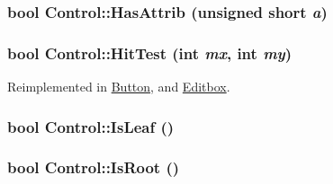 \hypertarget{class_control_969c60da0ff3cfd832a26a1310e0930d}{
\subsubsection[{HasAttrib}]{\setlength{\rightskip}{0pt plus 5cm}bool Control::HasAttrib (unsigned short {\em a})}}
\label{class_control_969c60da0ff3cfd832a26a1310e0930d}


\hypertarget{class_control_6b586494213774ccc17b161f8ed14888}{
\subsubsection[{HitTest}]{\setlength{\rightskip}{0pt plus 5cm}bool Control::HitTest (int {\em mx}, \/  int {\em my})}}
\label{class_control_6b586494213774ccc17b161f8ed14888}




Reimplemented in \hyperlink{class_button_8de2fc8228ff5599b4aaf1ae3db0725f}{Button}, and \hyperlink{class_editbox_2eacf0b4a9e2f2fd20125658156fb4e0}{Editbox}.\hypertarget{class_control_01d8251453924ad80bf6271308b9f6fd}{
\subsubsection[{IsLeaf}]{\setlength{\rightskip}{0pt plus 5cm}bool Control::IsLeaf ()}}
\label{class_control_01d8251453924ad80bf6271308b9f6fd}


\hypertarget{class_control_722115b12e4f4c66a1ce8f4fba9c350f}{
\subsubsection[{IsRoot}]{\setlength{\rightskip}{0pt plus 5cm}bool Control::IsRoot ()}}
\label{class_control_722115b12e4f4c66a1ce8f4fba9c350f}




